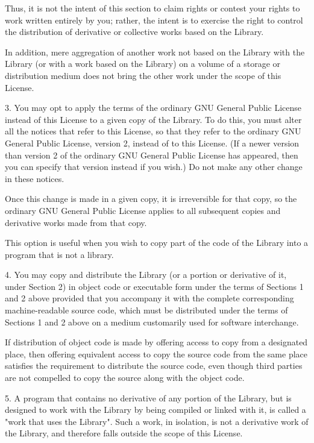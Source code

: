 \documentclass[twoside]{tceusermanual}
\begin{document}
Thus, it is not the intent of this section to claim rights or
contest your rights to work written entirely by you; rather, the
intent is to exercise the right to control the distribution of
derivative or collective works based on the Library.

In addition, mere aggregation of another work not based on the
Library with the Library (or with a work based on the Library)
on a volume of a storage or distribution medium does not bring
the other work under the scope of this License.

3. You may opt to apply the terms of the ordinary GNU General
Public License instead of this License to a given copy of the
Library.  To do this, you must alter all the notices that refer
to this License, so that they refer to the ordinary GNU General
Public License, version 2, instead of to this License.  (If a
newer version than version 2 of the ordinary GNU General Public
License has appeared, then you can specify that version instead
if you wish.)  Do not make any other change in these notices.
 
Once this change is made in a given copy, it is irreversible for
that copy, so the ordinary GNU General Public License applies to
all subsequent copies and derivative works made from that copy.

This option is useful when you wish to copy part of the code of
the Library into a program that is not a library.

4. You may copy and distribute the Library (or a portion or
derivative of it, under Section 2) in object code or executable
form under the terms of Sections 1 and 2 above provided that you
accompany it with the complete corresponding machine-readable
source code, which must be distributed under the terms of
Sections 1 and 2 above on a medium customarily used for software
interchange.

If distribution of object code is made by offering access to
copy from a designated place, then offering equivalent access to
copy the source code from the same place satisfies the
requirement to distribute the source code, even though third
parties are not compelled to copy the source along with the
object code.

5. A program that contains no derivative of any portion of the
Library, but is designed to work with the Library by being
compiled or linked with it, is called a "work that uses the
Library".  Such a work, in isolation, is not a derivative work
of the Library, and therefore falls outside the scope of this
License.
\end{document}

